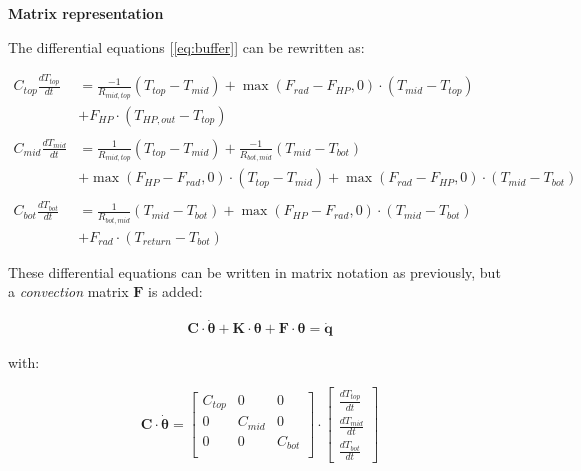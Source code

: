 \textbf{Matrix representation}

The differential equations [\ref{eq:buffer}] can be rewritten as:

{\color{teal}
	\begin{equation}
		\begin{aligned}
			C_{top}\frac{dT_{top}}{dt} &= \frac{-1}{R_{mid, top}} (T_{top}-T_{mid}) + \max(F_{rad}-F_{HP}, 0) \cdot (T_{mid} - T_{top}) \\
			&+ F_{HP} \cdot (T_{HP,out} - T_{top})
			\\ \\
			C_{mid}\frac{dT_{mid}}{dt} &= \frac{1}{R_{mid, top}} (T_{top}-T_{mid}) + \frac{-1}{R_{bot, mid}}(T_{mid}-T_{bot}) \\
			& + \max(F_{HP}-F_{rad}, 0) \cdot (T_{top} - T_{mid}) + \max(F_{rad}-F_{HP}, 0)  \cdot (T_{mid} - T_{bot}) 
			\\ \\
			C_{bot}\frac{dT_{bot}}{dt} &= \frac{1}{R_{bot, mid}} (T_{mid}-T_{bot}) + \max(F_{HP} - F_{rad}, 0) \cdot (T_{mid} - T_{bot})\\
			& + F_{rad} \cdot (T_{return} - T_{bot}) 
		\end{aligned}
	\end{equation}
}

These differential equations can be written in matrix notation as previously, but a \emph{convection} matrix $\mathbf{F}$ is added:

\begin{subequations}
	\label{eq:matnot}
	\begin{align}
		\mathbf{C} \cdot \boldsymbol{\dot{\theta}} + \mathbf{K} \cdot \boldsymbol{\theta} + \mathbf{F} \cdot \boldsymbol{\theta}= \mathbf{\dot{q}}
	\end{align}
\end{subequations}

with:

\begin{equation}
	\mathbf{C} \cdot \boldsymbol{\dot{\theta}} =
	\begin{bmatrix}
		C_{top} & 0 & 0 \\
		0 &  C_{mid} & 0 \\
		0 & 0 & C_{bot} \\
	\end{bmatrix}
	\cdot
	\begin{bmatrix}
		\frac{dT_{top}}{dt} \\
		\frac{dT_{mid}}{dt} \\
		\frac{dT_{bot}}{dt}
	\end{bmatrix}
\end{equation}


